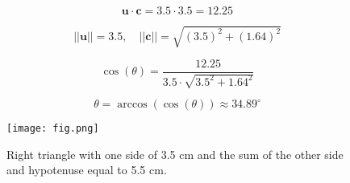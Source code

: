 \documentclass[journal]{IEEEtran}
\begin{document}
\[
\mathbf{u} \cdot \mathbf{c} = 3.5 \cdot 3.5 = 12.25 
\]

\[
||\mathbf{u}|| = 3.5, \quad ||\mathbf{c}|| = \sqrt{(3.5)^2 + (1.64)^2} 
\]

\[
\cos(\theta) = \frac{12.25}{3.5 \cdot \sqrt{3.5^2 + 1.64^2}} 
\]

\[
\theta = \arccos\left(\cos(\theta)\right) \approx 34.89^\circ 
\]

\begin{figure}[h!]
\centering
\texttt{[image: fig.png]} %
\caption{Right triangle with one side of 3.5 cm and the sum of the other side and hypotenuse equal to 5.5 cm.}
\end{figure}
\end{document}
